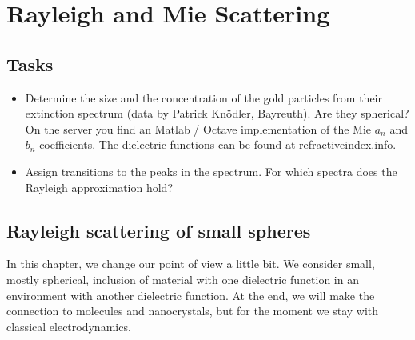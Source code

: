 \renewcommand{\lastmod}{May 6, 2021}
\renewcommand{\chapterauthors}{Markus Lippitz}


\chapter{Rayleigh and Mie Scattering}

\label{chap:rayleigh_and_mie}



\section{Tasks}

\begin{itemize}
\item Determine the size and the concentration of the gold particles from their extinction spectrum (data by Patrick Knödler, Bayreuth). Are they spherical? On the server you find an Matlab / Octave implementation of the Mie $a_n$ and $b_n$ coefficients. The dielectric functions can be found at \href{https://refractiveindex.info/}{refractiveindex.info}.

\item Assign transitions to the peaks in the spectrum. For which spectra does the Rayleigh approximation hold?


\end{itemize}


\section{Rayleigh scattering of small spheres}


In this chapter, we change our point of view a little bit. We consider small, mostly spherical, inclusion of material with one dielectric function in an environment with another dielectric function. At the end, we will make the connection to molecules and nanocrystals, but for the moment we stay with classical electrodynamics.


